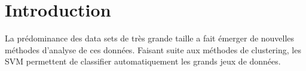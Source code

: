 \section{Introduction}

La prédominance des data sets de très grande taille
a fait émerger de nouvelles méthodes d’analyse de ces données.
Faisant suite aux méthodes de clustering,
les SVM permettent de classifier automatiquement les grands jeux de données.

\pagebreak
